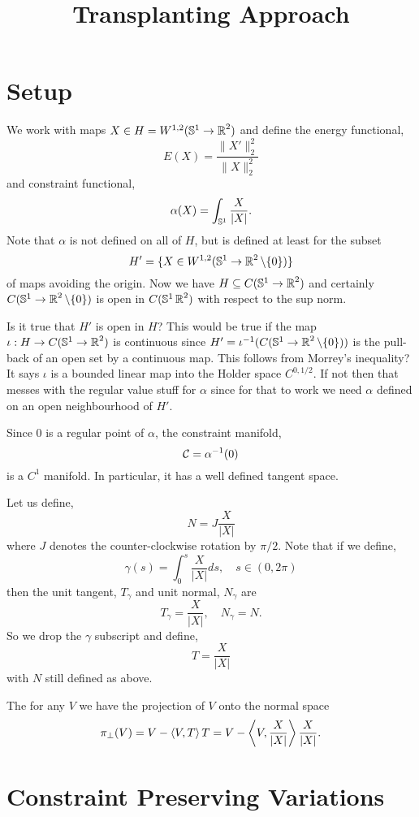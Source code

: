 \documentclass[12pt]{article}
\title{Transplanting Approach}
\date{}
\begin{document}
\maketitle

\section{Setup}

We work with maps \(X \in H = W^{1,2} (\operatorname{\mathbb{S}^1} \to \operatorname{\mathbb{R}}^2)\) and define the energy functional,
\[
E(X) = \frac{\|X'\|_2^2}{\|X\|_2^2}
\]
and constraint functional,
\[
\alpha(X) = \int_{\operatorname{\mathbb{S}^1}} \frac{X}{|X|}.
\]
Note that \(\alpha\) is not defined on all of \(H\), but is defined at least for the subset
\[
H' = \{X \in W^{1,2} (\operatorname{\mathbb{S}^1} \to \operatorname{\mathbb{R}}^2 \backslash \{0\})\}
\]
of maps avoiding the origin. Now we have \(H \subseteq C(\operatorname{\mathbb{S}^1} \to \operatorname{\mathbb{R}}^2)\) and certainly \(C(\operatorname{\mathbb{S}^1} \to \operatorname{\mathbb{R}}^2 \backslash \{0\})\) is open in \(C(\operatorname{\mathbb{S}^1} \operatorname{\mathbb{R}}^2)\) with respect to the sup norm.

{\color{red} Is it true that \(H'\) is open in \(H\)? This would be true if the map \(\iota : H \to C(\operatorname{\mathbb{S}^1} \to \operatorname{\mathbb{R}}^2)\) is continuous since \(H' = \iota^{-1}(C(\operatorname{\mathbb{S}^1} \to \operatorname{\mathbb{R}}^2 \backslash \{0\}))\) is the pull-back of an open set by a continuous map. This follows from Morrey's inequality? It says \(\iota\) is a bounded linear map into the Holder space \(C^{0,1/2}\). If not then that messes with the regular value stuff for \(\alpha\) since for that to work we need \(\alpha\) defined on an open neighbourhood of \(H'\).}

Since \(0\) is a regular point of \(\alpha\), the constraint manifold,
\[
\operatorname{\mathcal{C}} = \alpha^{-1} (0)
\]
is a \(C^1\) manifold. In particular, it has a well defined tangent space.

Let us define,
\[
N = J \frac{X}{|X|}
\]
where \(J\) denotes the counter-clockwise rotation by \(\pi/2\). Note that if we define,
\[
\gamma(s) = \int_0^s \frac{X}{|X|} ds, \quad s \in (0, 2\pi)
\]
then the unit tangent, \(T_{\gamma}\) and unit normal, \(N_{\gamma}\) are
\[
T_{\gamma} = \frac{X}{|X|}, \quad N_{\gamma} = N.
\]
So we drop the \(\gamma\) subscript and define,
\[
T = \frac{X}{|X|}
\]
with \(N\) still defined as above.

The for any \(V\) we have the projection of \(V\) onto the normal space
\[
\pi_{\perp} (V) = V - \left\langle{V},{T}\right\rangle T = V - \left\langle{V},{\frac{X}{|X|}}\right\rangle \frac{X}{|X|}.
\]


\section{Constraint Preserving Variations}
\end{document}
